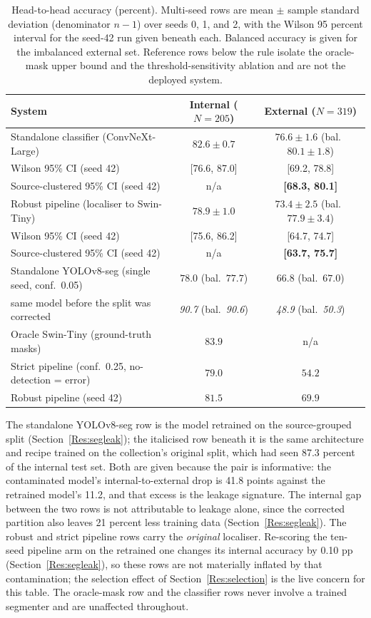 \documentclass{melba}
\begin{document}
\begin{table}[t]
\centering
\caption{Head-to-head accuracy (percent). Multi-seed rows are mean $\pm$ sample standard deviation (denominator $n-1$) over seeds 0, 1, and 2, with the Wilson 95 percent interval for the seed-42 run given beneath each. Balanced accuracy is given for the imbalanced external set. Reference rows below the rule isolate the oracle-mask upper bound and the threshold-sensitivity ablation and are not the deployed system.}
\small
\begin{tabular}{|l|c|c|}
\hline
System & Internal ($N=205$) & External ($N=319$) \\
\hline
Standalone classifier (ConvNeXt-Large) & $82.6 \pm 0.7$ & $76.6 \pm 1.6$ (bal.\ $80.1 \pm 1.8$) \\
\quad Wilson 95\% CI (seed 42) & [76.6, 87.0] & [69.2, 78.8] \\
\quad Source-clustered 95\% CI (seed 42) & n/a & \textbf{[68.3, 80.1]} \\
Robust pipeline (localiser to Swin-Tiny) & $78.9 \pm 1.0$ & $73.4 \pm 2.5$ (bal.\ $77.9 \pm 3.4$) \\
\quad Wilson 95\% CI (seed 42) & [75.6, 86.2] & [64.7, 74.7] \\
\quad Source-clustered 95\% CI (seed 42) & n/a & \textbf{[63.7, 75.7]} \\
Standalone YOLOv8-seg (single seed, conf.\ 0.05) & $\mathbf{78.0}$ (bal.\ $77.7$) & $\mathbf{66.8}$ (bal.\ $67.0$) \\
\quad same model before the split was corrected & \emph{90.7} (bal.\ \emph{90.6}) & \emph{48.9} (bal.\ \emph{50.3}) \\
\hline
Oracle Swin-Tiny (ground-truth masks) & $83.9$ & n/a \\
Strict pipeline (conf.\ 0.25, no-detection = error) & $79.0$ & $54.2$ \\
Robust pipeline (seed 42) & $81.5$ & $69.9$ \\
\hline
\end{tabular}

\vspace{2mm}
\parbox{0.95\textwidth}{\footnotesize The standalone YOLOv8-seg row is the model retrained on the source-grouped split (Section~\ref{Res:segleak}); the italicised row beneath it is the same architecture and recipe trained on the collection's original split, which had seen 87.3 percent of the internal test set. Both are given because the pair is informative: the contaminated model's internal-to-external drop is 41.8 points against the retrained model's 11.2, and that excess is the leakage signature. The internal gap between the two rows is not attributable to leakage alone, since the corrected partition also leaves 21 percent less training data (Section~\ref{Res:segleak}). The robust and strict pipeline rows carry the \emph{original} localiser. Re-scoring the ten-seed pipeline arm on the retrained one changes its internal accuracy by 0.10 pp (Section~\ref{Res:segleak}), so these rows are not materially inflated by that contamination; the selection effect of Section~\ref{Res:selection} is the live concern for this table. The oracle-mask row and the classifier rows never involve a trained segmenter and are unaffected throughout.

}
\end{table}
\end{document}
